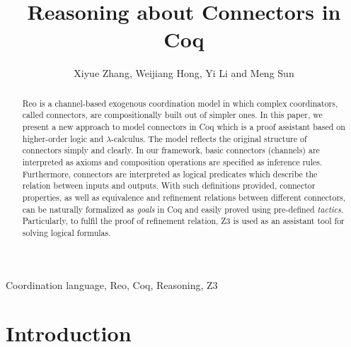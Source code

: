 \documentclass[3p,times]{elsarticle}
\begin{document}
\begin{frontmatter}

\title{Reasoning about Connectors in Coq}


\author{Xiyue Zhang, Weijiang Hong, Yi Li and Meng Sun}


\address{Department of Informatics and LMAM, School of Mathematical Sciences,\\ Peking University}

\begin{abstract}
Reo is a channel-based exogenous coordination model in which complex coordinators, called connectors, are compositionally
built out of simpler ones. In this paper, we present a new approach to model connectors in Coq which is a proof assistant based on higher-order logic and $\lambda$-calculus.
The model reflects the original structure of connectors simply and clearly. In our framework, basic connectors (channels) are interpreted as axioms and composition operations are specified as inference rules. Furthermore, connectors are interpreted as logical predicates which describe the relation
between inputs and outputs. With such definitions provided, connector properties, as well as equivalence and refinement relations between different connectors, can be naturally formalized as \emph{goals} in Coq and easily proved using pre-defined \emph{tactics}. Particularly, to fulfil the proof of refinement relation, Z3 is used as an assistant tool for solving logical formulas.

\end{abstract}
\begin{keyword}
Coordination language, Reo, Coq, Reasoning, Z3
\end{keyword}
\end{frontmatter}
\section{Introduction}\label{sec:introduction}
\end{document}
